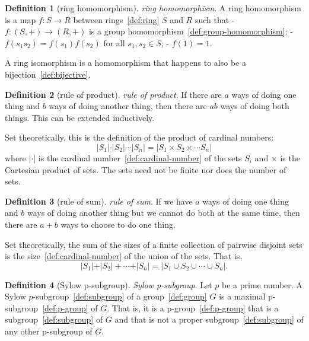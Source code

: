 \documentclass[12pt,a4paper]{article}
\theoremstyle{definition}
\newtheorem{definition}{Definition}
\begin{document}
\begin{definition}[ring homomorphism]\label{def:ring-homomorphism}
\emph{ring homomorphism}. A ring homomorphism is a map $f:S\to R$ between rings~\ref{def:ring} $S$ and $R$ such that 
- $f:(S,+) \to (R,+)$ is a group homomorphism~\ref{def:group-homomorphism};
- $f(s_1s_2)= f(s_1)f(s_2)$ for all $s_1,s_2\in S$;
- $f(1) = 1$.

A ring isomorphism is a homomorphism that happens to also be a bijection~\ref{def:bijective}.
\end{definition}

\begin{definition}[rule of product]\label{def:rule-of-product}
\emph{rule of product}. If there are $a$ ways of doing one thing and $b$ ways of doing another thing, then there are $ab$ ways of doing both things.  This can be extended inductively.

Set theoretically, this is the definition of the product of cardinal numbers: $$\vert S_1\vert \cdot\vert S_2\vert \cdots\vert S_n\vert  = \vert S_1\times S_2\times\cdots S_n\vert $$ where $\vert \cdot\vert $ is the cardinal number~\ref{def:cardinal-number} of the sets $S_i$ and $\times$ is the Cartesian product of sets. The sets need not be finite nor does the number of sets.
\end{definition}

\begin{definition}[rule of sum]\label{def:rule-of-sum}
\emph{rule of sum}. If we have $a$ ways of doing one thing and $b$ ways of doing another thing but we cannot do both at the same time, then there are $a+b$ ways to choose to do one thing.

Set theoretically, the sum of the sizes of a finite collection of pairwise disjoint sets is the size~\ref{def:cardinal-number} of the union of the sets. That is,
$$\vert S_1\vert  + \vert S_2\vert  + \cdots + \vert S_n\vert  = \vert S_1\cup S_2\cup\cdots\cup S_n\vert .$$
\end{definition}

\begin{definition}[Sylow p-subgroup]\label{def:sylow-p-subgroup}
\emph{Sylow p-subgroup}. Let $p$ be a prime number. A Sylow $p$-subgroup~\ref{def:subgroup} of a group~\ref{def:group} $G$ is a maximal p-subgroup~\ref{def:p-group} of $G$. That is, it is a p-group~\ref{def:p-group} that is a subgroup~\ref{def:subgroup} of $G$ and that is not a proper subgroup~\ref{def:subgroup} of any other p-subgroup of $G$.
\end{definition}
\end{document}
